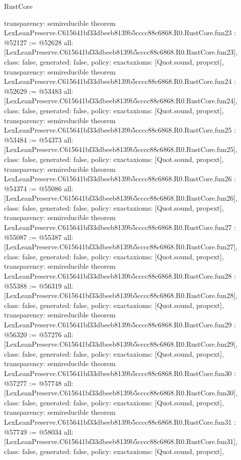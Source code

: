 \begin{lexlean}{RustCore}
\begin{coremodule}
{  transparency: semireducible
}
theorem LexLeanPreserve.C615641bf33dbeeb8139b5cccc88c6868.R0.RustCore.fun23 : @52127 := @52628 {
  all: [LexLeanPreserve.C615641bf33dbeeb8139b5cccc88c6868.R0.RustCore.fun23],
  class: false,
  generated: false,
  policy: exact{axioms: [Quot.sound, propext]},
  transparency: semireducible
}
theorem LexLeanPreserve.C615641bf33dbeeb8139b5cccc88c6868.R0.RustCore.fun24 : @52629 := @53483 {
  all: [LexLeanPreserve.C615641bf33dbeeb8139b5cccc88c6868.R0.RustCore.fun24],
  class: false,
  generated: false,
  policy: exact{axioms: [Quot.sound, propext]},
  transparency: semireducible
}
theorem LexLeanPreserve.C615641bf33dbeeb8139b5cccc88c6868.R0.RustCore.fun25 : @53484 := @54373 {
  all: [LexLeanPreserve.C615641bf33dbeeb8139b5cccc88c6868.R0.RustCore.fun25],
  class: false,
  generated: false,
  policy: exact{axioms: [Quot.sound, propext]},
  transparency: semireducible
}
theorem LexLeanPreserve.C615641bf33dbeeb8139b5cccc88c6868.R0.RustCore.fun26 : @54374 := @55086 {
  all: [LexLeanPreserve.C615641bf33dbeeb8139b5cccc88c6868.R0.RustCore.fun26],
  class: false,
  generated: false,
  policy: exact{axioms: [Quot.sound, propext]},
  transparency: semireducible
}
theorem LexLeanPreserve.C615641bf33dbeeb8139b5cccc88c6868.R0.RustCore.fun27 : @55087 := @55387 {
  all: [LexLeanPreserve.C615641bf33dbeeb8139b5cccc88c6868.R0.RustCore.fun27],
  class: false,
  generated: false,
  policy: exact{axioms: [Quot.sound, propext]},
  transparency: semireducible
}
theorem LexLeanPreserve.C615641bf33dbeeb8139b5cccc88c6868.R0.RustCore.fun28 : @55388 := @56319 {
  all: [LexLeanPreserve.C615641bf33dbeeb8139b5cccc88c6868.R0.RustCore.fun28],
  class: false,
  generated: false,
  policy: exact{axioms: [Quot.sound, propext]},
  transparency: semireducible
}
theorem LexLeanPreserve.C615641bf33dbeeb8139b5cccc88c6868.R0.RustCore.fun29 : @56320 := @57276 {
  all: [LexLeanPreserve.C615641bf33dbeeb8139b5cccc88c6868.R0.RustCore.fun29],
  class: false,
  generated: false,
  policy: exact{axioms: [Quot.sound, propext]},
  transparency: semireducible
}
theorem LexLeanPreserve.C615641bf33dbeeb8139b5cccc88c6868.R0.RustCore.fun30 : @57277 := @57748 {
  all: [LexLeanPreserve.C615641bf33dbeeb8139b5cccc88c6868.R0.RustCore.fun30],
  class: false,
  generated: false,
  policy: exact{axioms: [Quot.sound, propext]},
  transparency: semireducible
}
theorem LexLeanPreserve.C615641bf33dbeeb8139b5cccc88c6868.R0.RustCore.fun31 : @57749 := @58034 {
  all: [LexLeanPreserve.C615641bf33dbeeb8139b5cccc88c6868.R0.RustCore.fun31],
  class: false,
  generated: false,
  policy: exact{axioms: [Quot.sound, propext]},
}
\end{coremodule}
\end{lexlean}
